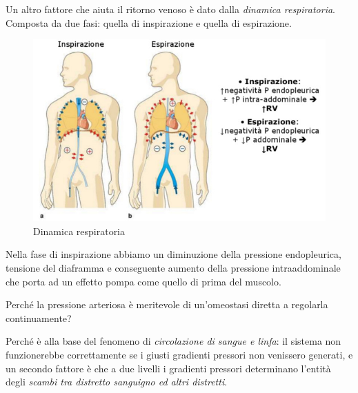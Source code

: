 \documentclass[a4paper,12pt]{article}
\begin{document}
Un altro fattore che aiuta il ritorno venoso è dato dalla \emph{dinamica respiratoria}. Composta da due fasi: quella di inspirazione e quella di espirazione.
\begin{figure}[H]
\centering
\includegraphics[scale=0.35]{immagine/inspesp.jpg}
\caption{Dinamica respiratoria}
\end{figure}

Nella fase di inspirazione abbiamo un diminuzione della pressione endopleurica, tensione del diaframma e conseguente aumento della pressione intraaddominale che porta ad un effetto pompa come quello di prima del muscolo.

Perché la pressione arteriosa è meritevole di un'omeostasi diretta a regolarla continuamente?

Perché è alla base del fenomeno di \emph{circolazione di sangue e linfa}: il sistema non funzionerebbe correttamente se i giusti gradienti pressori non venissero generati, e un secondo fattore è che a due livelli i gradienti pressori determinano l'entità degli \emph{scambi tra distretto sanguigno ed altri distretti}.
\end{document}

